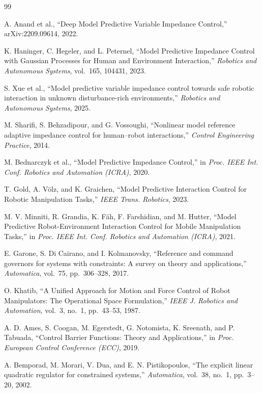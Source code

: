 \documentclass[journal]{IEEEtran}
\begin{document}
\begin{thebibliography}{99}

A. Anand et al., ``Deep Model Predictive Variable Impedance Control,''
arXiv:2209.09614, 2022.

K. Haninger, C. Hegeler, and L. Peternel, ``Model Predictive Impedance
Control with Gaussian Processes for Human and Environment Interaction,''
\emph{Robotics and Autonomous Systems}, vol.~165, 104431, 2023.

S. Xue et al., ``Model predictive variable impedance control towards
safe robotic interaction in unknown disturbance-rich environments,''
\emph{Robotics and Autonomous Systems}, 2025.

M. Sharifi, S. Behzadipour, and G. Vossoughi, ``Nonlinear model
reference adaptive impedance control for human--robot interactions,''
\emph{Control Engineering Practice}, 2014.

M. Bednarczyk et al., ``Model Predictive Impedance Control,'' in
\emph{Proc. IEEE Int. Conf. Robotics and Automation (ICRA)}, 2020.

T. Gold, A. V\"olz, and K. Graichen, ``Model Predictive Interaction
Control for Robotic Manipulation Tasks,'' \emph{IEEE Trans. Robotics},
2023.

M. V. Minniti, R. Grandia, K. F\"ah, F. Farshidian, and M. Hutter,
``Model Predictive Robot-Environment Interaction Control for Mobile
Manipulation Tasks,'' in \emph{Proc. IEEE Int. Conf. Robotics and
Automation (ICRA)}, 2021.

E. Garone, S. Di Cairano, and I. Kolmanovsky, ``Reference and command
governors for systems with constraints: A survey on theory and
applications,'' \emph{Automatica}, vol.~75, pp.~306--328, 2017.

O. Khatib, ``A Unified Approach for Motion and Force Control of Robot
Manipulators: The Operational Space Formulation,'' \emph{IEEE J.
Robotics and Automation}, vol.~3, no.~1, pp.~43--53, 1987.

A. D. Ames, S. Coogan, M. Egerstedt, G. Notomista, K. Sreenath, and
P. Tabuada, ``Control Barrier Functions: Theory and Applications,'' in
\emph{Proc. European Control Conference (ECC)}, 2019.

A. Bemporad, M. Morari, V. Dua, and E. N. Pistikopoulos, ``The explicit
linear quadratic regulator for constrained systems,'' \emph{Automatica},
vol.~38, no.~1, pp.~3--20, 2002.


\end{thebibliography}
\end{document}
